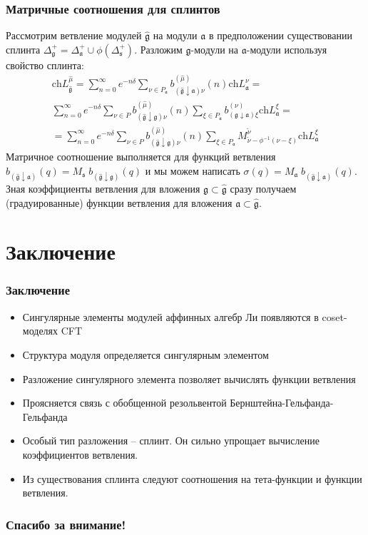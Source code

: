 \documentclass[pdftex]{beamer}
\newcommand{\gf}{\mathfrak{g}}
\newcommand{\gfh}{\hat{\mathfrak{g}}}
\newcommand{\af}{\mathfrak{a}}
\newcommand{\sfr}{\mathfrak{s}}
\theoremstyle{definition} \newtheorem{Def}{Определение}
\begin{document}
\begin{frame}
    \frametitle{Матричные соотношения для сплинтов}
Рассмотрим ветвление модулей  $\gfh$ на модули $\af$ в предположении существовании сплинта
$\Delta^{+}_{\gf}=\Delta^{+}_{\af}\cup \phi(\Delta^{+}_{\sfr})$.
Разложим  $\gf$-модули на 
$\af$-модули используя свойство сплинта:
\begin{multline}
  \label{eq:125}
  \mathrm{ch}L^{\hat{\mu}}_{\gfh}=
\sum_{n=0}^{\infty}e^{-n\delta} \sum_{\nu\in P_{\af}} b^{(\hat{\mu})}_{(\gfh\downarrow\af)\nu}(n) \mathrm{ch} L^{\nu}_{\af}=\\
\sum_{n=0}^{\infty} e^{-n\delta} \sum_{\nu\in P} b^{(\hat{\mu})}_{(\gfh\downarrow\gf )\nu}(n) \sum_{\xi\in P_{\af}} b^{(\nu)}_{(\gf\downarrow \af) \xi}\mathrm{ch} L^{\xi}_{\af}=\\
=\sum_{n=0}^{\infty} e^{-n\delta} \sum_{\nu\in P} b^{(\hat{\mu})}_{(\gfh\downarrow\gf )\nu}(n) \sum_{\xi\in P_{\af}} M^{\widetilde{\nu}}_{  \widetilde{\nu}-\phi^{-1}( \nu-\xi )}\mathrm{ch} L^{\xi}_{\af}
\end{multline}
  Матричное соотношение выполняется для функций ветвления $b_{(\gfh\downarrow\af)}(q)= M_{\sfr}\;
b_{(\gfh\downarrow\gf)}(q)$ и мы можем написать
$\sigma(q)=M_{\af}\; b_{(\gfh\downarrow\af)}(q)$.  Зная коэффициенты ветвления для вложения $\gf\subset\gfh$  сразу получаем (градуированные) функции ветвления для вложения $\af\subset \gfh$.
\end{frame}


\section{Заключение}


\begin{frame}
  \frametitle{Заключение}
  \begin{itemize}
  \item Сингулярные элементы модулей аффинных алгебр Ли появляются в coset-моделях CFT
  \item Структура модуля определяется сингулярным элементом
  \item Разложение сингулярного элемента позволяет вычислять функции ветвления
  \item Проясняется связь с обобщенной резольвентой Бернштейна-Гельфанда-Гельфанда
  \item Особый тип разложения -- сплинт. Он сильно упрощает вычисление коэффициентов ветвления.
  \item Из существования сплинта следуют соотношения на тета-функции и функции ветвления.
  \end{itemize}
\end{frame}
\begin{frame}
  \frametitle{Спасибо за внимание!}
\end{frame}
\end{document}
